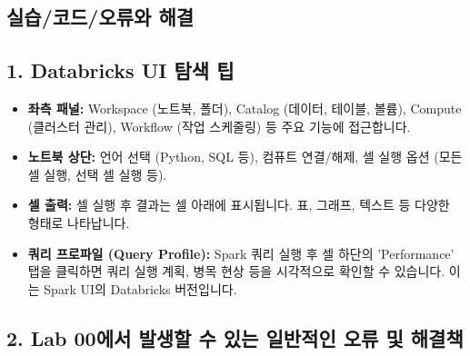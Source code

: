 \documentclass[11pt,a4paper]{article}
\begin{document}
\begin{itemize}
\section*{실습/코드/오류와 해결}

\subsection*{1. Databricks UI 탐색 팁}

\begin{itemize}
    \item \textbf{좌측 패널:} Workspace (노트북, 폴더), Catalog (데이터, 테이블, 볼륨), Compute (클러스터 관리), Workflow (작업 스케줄링) 등 주요 기능에 접근합니다.
    \item \textbf{노트북 상단:} 언어 선택 (Python, SQL 등), 컴퓨트 연결/해제, 셀 실행 옵션 (모든 셀 실행, 선택 셀 실행 등).
    \item \textbf{셀 출력:} 셀 실행 후 결과는 셀 아래에 표시됩니다. 표, 그래프, 텍스트 등 다양한 형태로 나타납니다.
    \item \textbf{쿼리 프로파일 (Query Profile):} Spark 쿼리 실행 후 셀 하단의 'Performance' 탭을 클릭하면 쿼리 실행 계획, 병목 현상 등을 시각적으로 확인할 수 있습니다. 이는 Spark UI의 Databricks 버전입니다.
\end{itemize}

\subsection*{2. Lab 00에서 발생할 수 있는 일반적인 오류 및 해결책}


\end{itemize}
\end{document}

